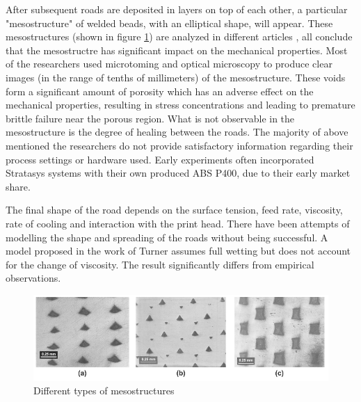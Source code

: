 After subsequent roads are deposited in layers on top of each other, a particular "mesostructure" of welded beads, with an elliptical shape, will appear. These mesostructures (shown in figure \ref{fig:mesostructure}) are analyzed in different articles \cite{Somireddy2017MechanicalMesostructure}
\cite{Somireddy2018DevelopmentFDM}
\cite{Li2002CompositeProperties} \cite{Rodriguez2001MechanicalInvestigation}
\cite{Rodriguez2003MechanicalModeling}
\cite{Blok2018AnComposites} 
\cite{Sun2008}, all conclude that the mesostructre has significant impact on the mechanical properties.
Most of the researchers used microtoming and optical microscopy to produce clear images (in the range of tenths of millimeters) of the mesostructure. These voids form a significant amount of porosity which has an adverse effect on the mechanical properties, resulting in stress concentrations and leading to premature brittle failure  near the porous region.  What is not observable in the mesostructure is the degree of healing between the roads. 
The majority of above mentioned the researchers do not provide satisfactory information regarding their process settings or hardware used. Early experiments often incorporated Stratasys systems with their own produced ABS P400, due to their early market share. 

The final shape of the road depends on the surface tension, feed rate, viscosity, rate of cooling and interaction with the print head. There have been attempts of modelling the shape and spreading of the roads without being successful. A model proposed in the work of Turner \cite{Turner2014AModeling} assumes full wetting but does not account for the change of viscosity. The result significantly differs from empirical observations. 

\begin{figure}[H]
    \centering
    \includegraphics[width=1\textwidth]{chapter_2/figures/Mesostructure.PNG}
    \caption{Different types of mesostructures \cite{Rodriguez2001MechanicalInvestigation}}
    \label{fig:mesostructure}
\end{figure}

